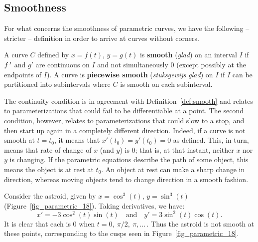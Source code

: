 \begin{example}
\end{example}


\subsection{Smoothness}
For what concerns the smoothness of parametric curves, we have the following -- stricter -- definition in order to arrive at curves without corners. 

\begin{definition}\label{def:smooth2}
A curve $C$ defined by $x=f(t)$, $y=g(t)$ is \textbf{smooth} (\textit{glad}) on an interval $I$ if $f\,'$ and $g'$ are continuous on $I$ and not simultaneously 0 (except possibly at the endpoints of $I$). A curve is \textbf{piecewise smooth} (\textit{stuksgewijs glad}) on $I$ if $I$ can be partitioned into subintervals where $C$ is smooth on each subinterval.
\end{definition}

The continuity condition is in agreement with Definition~\ref{def:smooth} and relates to parameterizations that could fail to be differentiable at a point. The second condition, however, relates to parameterizations that could slow to a stop, and then start up again in a completely different direction.  Indeed, if a curve is not smooth at $t=t_0$, it means that $x'(t_0)=y'(t_0)=0$ as defined. This, in turn, means that rate of change of $x$ (and $y$) is 0; that is, at that instant, neither $x$ nor $y$ is changing. If the parametric equations describe the path of some object, this means the object is at rest at $t_0$. An object at rest can make a sharp change in direction, whereas moving objects tend to change direction in a smooth fashion.


Consider the astroid, given by $x=\cos^3(t)$, $y=\sin^3(t)$ (Figure~\ref{fig_parametric_18}). Taking derivatives, we have:
$$x' = -3\cos^2(t)\sin (t)\quad \text{and}\quad y' = 3\sin^2(t)\cos (t).$$
It is clear that each is 0 when $t=0,\ \pi/2,\ \pi,\ldots\,.$ Thus the astroid is not smooth at these points, corresponding to the cusps seen in Figure~\ref{fig_parametric_18}.

